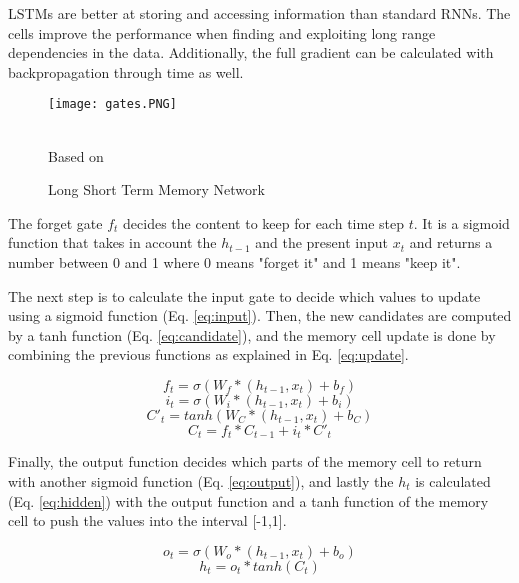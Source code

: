 LSTMs are better at storing and accessing information than standard RNNs. The cells improve the performance when finding and exploiting long range dependencies in the data. Additionally, the full gradient can be calculated with backpropagation through time as well.\cite{graves2013generating}

\begin{figure}
\center
\texttt{[image: gates.PNG]}
\caption{Long Short Term Memory Network}
\label{fig:lstm}
\begin{minipage}{12cm}
    \footnotesize
    \center
    \emph \\ Based on \cite{greff2016lstm}
    \end{minipage}
\end{figure}

The forget gate $f_t$ decides the content to keep for each time step $t$. It is a sigmoid function that takes in account the $h_{t-1}$ and the present input $x_t$ and returns a number between 0 and 1 where 0 means "forget it" and 1 means "keep it". 

The next step is to calculate the input gate to decide which values to update using a sigmoid function (Eq. \ref{eq:input}). Then, the new candidates are computed by a tanh function (Eq. \ref{eq:candidate}), and the memory cell update is done by combining the previous functions as explained in Eq. \ref{eq:update}.

\begin{equation} \label{eq:forget}
f_t=\sigma(W_f*(h_{t-1},x_t)+b_f)
\end{equation}
\begin{equation} \label{eq:input}
i_t=\sigma(W_i*(h_{t-1},x_t)+b_i)
\end{equation}
\begin{equation} \label{eq:candidate}
C'_t=tanh(W_C*(h_{t-1},x_t)+b_C)
\end{equation}
\begin{equation} \label{eq:update}
C_t=f_t*C_{t-1}+i_t*C'_t
\end{equation}

Finally, the output function decides which parts of the memory cell to return with another sigmoid function (Eq. \ref{eq:output}), and lastly the $h_t$ is calculated (Eq. \ref{eq:hidden}) with the output function and a tanh function of the memory cell to push the values into the interval [-1,1].

\begin{equation} \label{eq:output}
o_t=\sigma(W_o*(h_{t-1},x_t)+b_o)
\end{equation}
\begin{equation} \label{eq:hidden}
h_t=o_t*tanh(C_t)
\end{equation}

